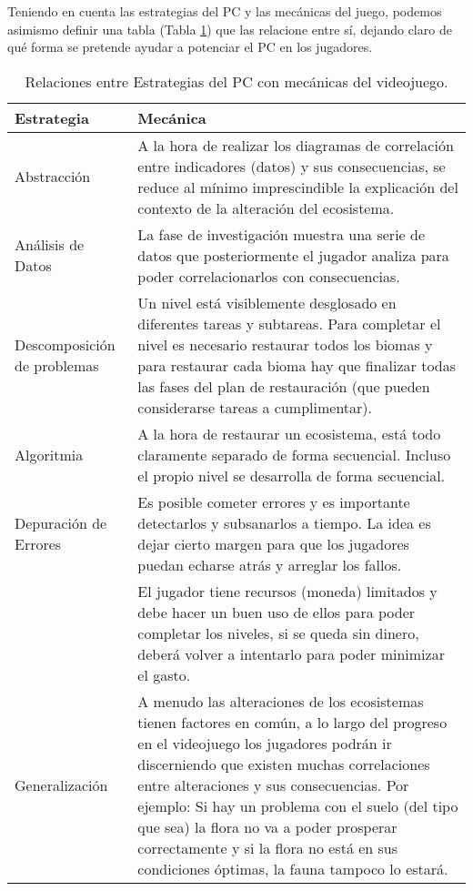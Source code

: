 Teniendo en cuenta las estrategias del PC y las mecánicas del juego, podemos asimismo definir una tabla (Tabla \ref{fig:tablaPCMecanicas}) que las relacione entre sí, dejando claro de qué forma se pretende ayudar a potenciar el PC en los jugadores.
\raggedbottom
\begin{table}[H]
\begin{center}
\setlength{\tabcolsep}{5pt}
\renewcommand{\arraystretch}{1.2}
\begin{tabular}{ | m{8em} | m{30em} | } 
  \hline
  Estrategia & Mecánica \\ 
  \hline
  Abstracción & A la hora de realizar los diagramas de correlación entre indicadores (datos) y sus consecuencias, se reduce al mínimo imprescindible la explicación del contexto de la alteración del ecosistema. \\ 
  \hline
  Análisis de Datos & La fase de investigación muestra una serie de datos que posteriormente el jugador analiza para poder correlacionarlos con consecuencias. \\ 
  \hline
  Descomposición de problemas & Un nivel está visiblemente desglosado en diferentes tareas y subtareas. Para completar el nivel es necesario restaurar todos los biomas y para restaurar cada bioma hay que finalizar todas las fases del plan de restauración (que pueden considerarse tareas a cumplimentar). \\ 
  \hline
  Algoritmia & A la hora de restaurar un ecosistema, está todo claramente separado de forma secuencial. Incluso el propio nivel se desarrolla de forma secuencial. \\ 
  \hline
  Depuración de Errores & Es posible cometer errores y es importante detectarlos y subsanarlos a tiempo. La idea es dejar cierto margen para que los jugadores puedan echarse atrás y arreglar los fallos. \\ 
  \hline
    & El jugador tiene recursos (moneda) limitados y debe hacer un buen uso de ellos para poder completar los niveles, si se queda sin dinero, deberá volver a intentarlo para poder minimizar el gasto. \\ 
  \hline
  Generalización & A menudo las alteraciones de los ecosistemas tienen factores en común, a lo largo del progreso en el videojuego los jugadores podrán ir discerniendo que existen muchas correlaciones entre alteraciones y sus consecuencias. Por ejemplo: Si hay un problema con el suelo (del tipo que sea) la flora no va a poder prosperar correctamente y si la flora no está en sus condiciones óptimas, la fauna tampoco lo estará. \\ 
  \hline
\end{tabular}
\centering
\caption{Relaciones entre Estrategias del PC con mecánicas del videojuego.}
\label{fig:tablaPCMecanicas}
\end{center}
\end{table}

